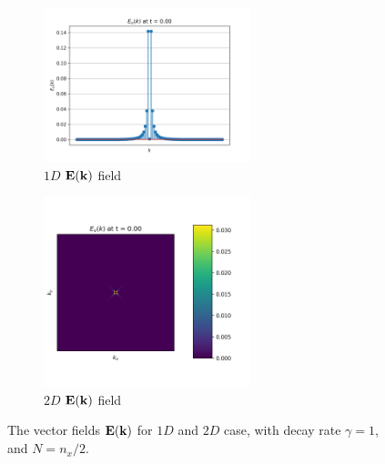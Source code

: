 \begin{figure}[H]
    \begin{subfigure}{7cm}
      \centering\includegraphics[width=6cm]{Code-Figures/sine-vel-prof-1d/EK_spectrum.png}
      \caption{$1D$ $\mathbf{E}(\mathbf{k})$ field}
    \end{subfigure}
    \begin{subfigure}{7cm}
      \centering\includegraphics[width=6cm]{Code-Figures/sine-vel-prof-2d/EK_spectrum.png}
      \caption{$2D$ $\mathbf{E}(\mathbf{k})$ field}
    \end{subfigure}
    \caption{The vector fields $\mathbf{E}(\mathbf{k})$ for $1D$ and $2D$ case, with decay rate $\gamma=1$, and $N=n_x/2$.}
    \label{fig:espec-vector-fields-gamma1}
\end{figure}

